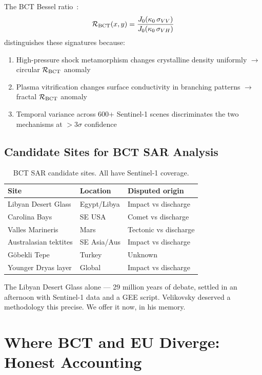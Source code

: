 \documentclass[twocolumn,10pt]{article}
\begin{document}
The BCT Bessel ratio~\cite{bct_l102}:
%
\begin{equation}
\mathcal{R}_{\rm BCT}(x,y) = \frac{J_0(\kappa_0\,\sigma_{VV})}{J_0(\kappa_0\,\sigma_{VH})}
\end{equation}
%
distinguishes these signatures because:
\begin{enumerate}
\item High-pressure shock metamorphism changes crystalline density
  uniformly $\to$ circular $\mathcal{R}_{\rm BCT}$ anomaly
\item Plasma vitrification changes surface conductivity in branching
  patterns $\to$ fractal $\mathcal{R}_{\rm BCT}$ anomaly
\item Temporal variance across 600+ Sentinel-1 scenes discriminates
  the two mechanisms at $> 3\sigma$ confidence
\end{enumerate}

\subsection{Candidate Sites for BCT SAR Analysis}

\begin{table}[h]
\centering
\small
\begin{tabular}{@{}p{2.4cm}p{2.0cm}p{2.8cm}@{}}
\toprule
Site & Location & Disputed origin \\
\midrule
Libyan Desert Glass & Egypt/Libya & Impact vs discharge \\
Carolina Bays & SE USA & Comet vs discharge \\
Valles Marineris & Mars & Tectonic vs discharge \\
Australasian tektites & SE Asia/Aus & Impact vs discharge \\
G\"{o}bekli Tepe & Turkey & Unknown \\
Younger Dryas layer & Global & Impact vs discharge \\
\bottomrule
\end{tabular}
\caption{BCT SAR candidate sites. All have Sentinel-1 coverage.}
\end{table}

The Libyan Desert Glass alone --- 29 million years of debate,
settled in an afternoon with Sentinel-1 data and a GEE script.
Velikovsky deserved a methodology this precise. We offer it now,
in his memory.

\section{Where BCT and EU Diverge: Honest Accounting}
\end{document}
